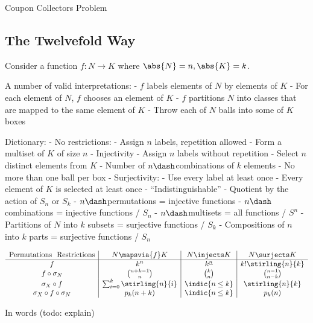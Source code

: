 Coupon Collectors Problem

\hypertarget{the-twelvefold-way}{%
\subsection{The Twelvefold Way}\label{the-twelvefold-way}}

Consider a function \(f: N \to K\) where \(\abs{N}=n, \abs{K} = k\).

A number of valid interpretations: - \(f\) labels elements of \(N\) by
elements of \(K\) - For each element of \(N\), \(f\) chooses an element
of \(K\) - \(f\) partitions \(N\) into classes that are mapped to the
same element of \(K\) - Throw each of \(N\) balls into some of \(K\)
boxes

Dictionary: - No restrictions: - Assign \(n\) labels, repetition allowed
- Form a multiset of \(K\) of size \(n\) - Injectivity - Assign \(n\)
labels without repetition - Select \(n\) distinct elements from \(K\) -
Number of \(n\dash\)combinations of \(k\) elements - No more than one
ball per box - Surjectivity: - Use every label at least once - Every
element of \(K\) is selected at least once - ``Indistinguishable'' -
Quotient by the action of \(S_n\) or \(S_k\) - \(n\dash\)permutations =
injective functions - \(n\dash\)combinations = injective functions /
\(S_n\) - \(n\dash\)multisets = all functions / \(S^n\) - Partitions of
\(N\) into \(k\) subsets = surjective functions / \(S_k\) - Compositions
of \(n\) into \(k\) parts = surjective functions / \(S_n\)

\begin{align*}
\begin{array}{c|c|c|c}
\text{Permutations \ Restrictions}  & N \mapsvia{f} K & N \injects K & N \surjects K
\\ \hline
f                                                           & k^n & k^{\underline{n}} & k! \stirling{n}{k}  \\
f \circ \sigma_N                                & {n+k-1}\choose n & k\choose n & {n-1}\choose{n-k} \\
\sigma_X \circ f                                & \sum_{i=0}^k \stirling{n}{i} & \indic{n \leq k} & \stirling{n}{k}\\
\sigma_X \circ f \circ \sigma_N & p_k(n+k) & \indic{n \leq k} & p_k(n)
\end{array}
\end{align*}

In words (todo: explain)

